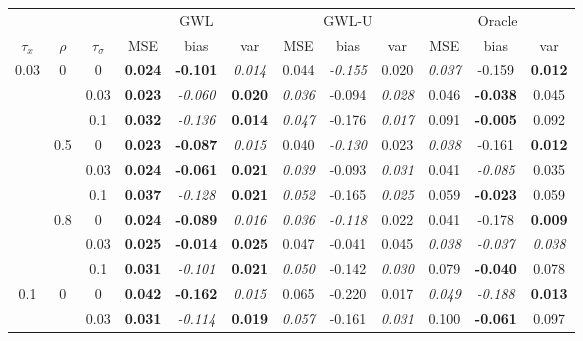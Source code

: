 \documentclass[authoryear, review, 11pt]{elsarticle}
\begin{document}
\begin{table}[ht]
\begin{center}
\begin{tabular}{ccc | ccc | ccc | ccc }
&&&\multicolumn{3}{c}{GWL}&\multicolumn{3}{c}{GWL-U}&\multicolumn{3}{c}{Oracle}\\$\tau_x$ & $\rho$ & $\tau_\sigma$ & MSE & bias & var &  MSE & bias & var &  MSE & bias & var\\   \hline
\multirow{9}{*}{0.03} & \multirow{3}{*}{0} & 0 & \textbf{0.024} & \textbf{-0.101} & \emph{0.014} & 0.044 & \emph{-0.155} & 0.020 & \emph{0.037} & -0.159 & \textbf{0.012} \\ 
 &  & 0.03 &   \textbf{0.023} & \emph{-0.060} & \textbf{0.020} & \emph{0.036} & -0.094 & \emph{0.028} & 0.046 & \textbf{-0.038} & 0.045 \\ 
 &  & 0.1 &   \textbf{0.032} & \emph{-0.136} & \textbf{0.014} & \emph{0.047} & -0.176 & \emph{0.017} & 0.091 & \textbf{-0.005} & 0.092 \\ \cline{2-12}
 & \multirow{3}{*}{0.5} & 0 &   \textbf{0.023} & \textbf{-0.087} & \emph{0.015} & 0.040 & \emph{-0.130} & 0.023 & \emph{0.038} & -0.161 & \textbf{0.012} \\ 
 &  & 0.03 &   \textbf{0.024} & \textbf{-0.061} & \textbf{0.021} & \emph{0.039} & -0.093 & \emph{0.031} & 0.041 & \emph{-0.085} & 0.035 \\ 
 &  & 0.1 &   \textbf{0.037} & \emph{-0.128} & \textbf{0.021} & \emph{0.052} & -0.165 & \emph{0.025} & 0.059 & \textbf{-0.023} & 0.059 \\ \cline{2-12}
 & \multirow{3}{*}{0.8} & 0 &   \textbf{0.024} & \textbf{-0.089} & \emph{0.016} & \emph{0.036} & \emph{-0.118} & 0.022 & 0.041 & -0.178 & \textbf{0.009} \\ 
 &  & 0.03 &   \textbf{0.025} & \textbf{-0.014} & \textbf{0.025} & 0.047 & -0.041 & 0.045 & \emph{0.038} & \emph{-0.037} & \emph{0.038} \\ 
 &  & 0.1 &   \textbf{0.031} & \emph{-0.101} & \textbf{0.021} & \emph{0.050} & -0.142 & \emph{0.030} & 0.079 & \textbf{-0.040} & 0.078 \\ \cline{1-12}
\multirow{9}{*}{0.1} & \multirow{3}{*}{0} & 0 &   \textbf{0.042} & \textbf{-0.162} & \emph{0.015} & 0.065 & -0.220 & 0.017 & \emph{0.049} & \emph{-0.188} & \textbf{0.013} \\ 
 &  & 0.03 &   \textbf{0.031} & \emph{-0.114} & \textbf{0.019} & \emph{0.057} & -0.161 & \emph{0.031} & 0.100 & \textbf{-0.061} & 0.097 \\ 

\end{tabular}
\end{center}
\end{table}
\end{document}
